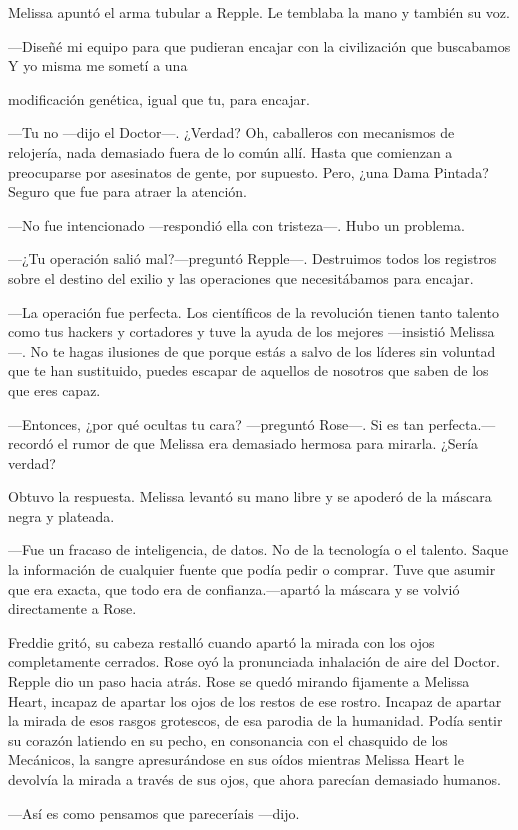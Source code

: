 {Melissa apuntó el arma tubular a Repple. Le temblaba la mano y también
su voz.}

{---Diseñé mi equipo para que pudieran encajar con la civilización que
buscabamos Y yo misma me sometí a una}

{modificación genética, igual que tu, para encajar.}

{---Tu no ---dijo el Doctor---. ¿Verdad? Oh, caballeros con mecanismos
	de relojería, nada demasiado fuera de lo común allí. Hasta que comienzan
	a preocuparse por asesinatos de gente, por supuesto. Pero, ¿una Dama
Pintada? Seguro que fue para atraer la atención.}

{---No fue intencionado ---respondió ella con tristeza---. Hubo un
problema.}

{---¿Tu operación salió mal?---preguntó Repple---. Destruimos todos los
	registros sobre el destino del exilio y las operaciones que
necesitábamos para encajar.}

{---La operación fue perfecta. Los científicos de la revolución tienen
	tanto talento como tus hackers y cortadores y tuve la ayuda de los
	mejores ---insistió Melissa---. No te hagas ilusiones de que porque
	estás a salvo de los líderes sin voluntad que te han sustituido, puedes
escapar de aquellos de nosotros que saben de los que eres capaz.}

{---Entonces, ¿por qué ocultas tu cara? ---preguntó Rose---. Si es tan
	perfecta.---recordó el rumor de que Melissa era demasiado hermosa para
mirarla. ¿Sería verdad?}

{Obtuvo la respuesta. Melissa levantó su mano libre y se apoderó de la
máscara negra y plateada.}

{---Fue un fracaso de inteligencia, de datos. No de la tecnología o el
	talento. Saque la información de cualquier fuente que podía pedir o
	comprar. Tuve que asumir que era exacta, que todo era de
confianza.---apartó la máscara y se volvió directamente a Rose.}

{Freddie gritó, su cabeza restalló cuando apartó la mirada con los ojos
	completamente cerrados. Rose oyó la pronunciada inhalación de aire del
	Doctor. Repple dio un paso hacia atrás. Rose se quedó mirando fijamente
	a Melissa Heart, incapaz de apartar los ojos de los restos de ese
	rostro. Incapaz de apartar la mirada de esos rasgos grotescos, de esa
	parodia de la humanidad. Podía sentir su corazón latiendo en su pecho,
	en consonancia con el chasquido de los Mecánicos, la sangre
	apresurándose en sus oídos mientras Melissa Heart le devolvía la mirada
a través de sus ojos, que ahora parecían demasiado humanos.}

{---Así es como pensamos que pareceríais ---dijo.}
